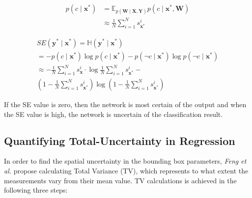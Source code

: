 \documentclass[10pt,twocolumn,letterpaper]{article}
\begin{document}
        \begin{equation}
            \label{prob_calc}
            \begin{aligned}
                p\left(c \mid \mathbf{x}^{*}\right) &=\mathbb{E}_{p(\mathbf{W} \mid \mathbf{X}, \mathbf{Y})} p\left(c \mid \mathbf{x}^{*}, \mathbf{W}\right) \\
                & \approx \frac{1}{N} \sum_{i=1}^{N} s_{\mathbf{x}^{*}}^{i}
            \end{aligned}
        \end{equation}
        
        \begin{equation}
            \label{Classification Uncertainty equation}
            \begin{array}{l}
                S E\left(\mathbf{y}^{*} \mid \mathbf{x}^{*}\right)=\mathbb{H}\left(\mathbf{y}^{*} \mid \mathbf{x}^{*}\right) \\
                =-p\left(c \mid \mathbf{x}^{*}\right) \log p\left(c \mid \mathbf{x}^{*}\right)-p\left(\neg c \mid \mathbf{x}^{*}\right) \log p\left(\neg c \mid \mathbf{x}^{*}\right) \\
                \approx-\frac{1}{N} \sum_{i=1}^{N} s_{\mathbf{x}}^{i} \cdot \log \frac{1}{N} \sum_{i=1}^{N} s_{\mathbf{x}^{*}}^{i}- \\ \left(1-\frac{1}{N} \sum_{i=1}^{N} s_{\mathbf{x}^{*}}^{i}\right) \log \left(1-\frac{1}{N} \sum_{i=1}^{N} s_{\mathbf{x}^{*}}^{i}\right)
            \end{array}
        \end{equation}
        
        If the SE value is zero, then the network is most certain of the output and when the SE value is high, the network is uncertain of the classification result.
        
         \subsection{Quantifying Total-Uncertainty in Regression}
         \label{uncertainty in bounding box regression}
         In order to find the spatial uncertainty in the bounding box parameters, \textit{Feng et al.} \cite{Feng2018} propose calculating Total Variance (TV), which represents to what extent the measurements vary from their mean value. TV calculations is achieved in the following three steps:
         
\end{document}
